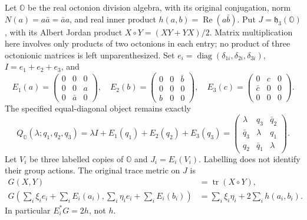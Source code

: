 Let $\mathbb O$ be the real octonion division algebra, with its original
conjugation, norm $N(a)=a\bar a=\bar a a$, and real inner product
$h(a,b)=\operatorname{Re}(a\bar b)$. Put $J=\mathfrak h_3(\mathbb O)$,
with its Albert Jordan product $X\circ Y=(XY+YX)/2$. Matrix multiplication
here involves only products of two octonions in each entry; no product
of three octonionic matrices is left unparenthesized. Set
$e_i=\operatorname{diag}(\delta_{1i},\delta_{2i},\delta_{3i})$,
$I=e_1+e_2+e_3$, and
\[
 E_1(a)=\begin{pmatrix}0&0&0\\0&0&a\\0&\bar a&0\end{pmatrix},\quad
 E_2(b)=\begin{pmatrix}0&0&\bar b\\0&0&0\\b&0&0\end{pmatrix},\quad
 E_3(c)=\begin{pmatrix}0&c&0\\\bar c&0&0\\0&0&0\end{pmatrix}.
\]
The specified equal-diagonal object remains exactly
\begin{equation}
 Q_{\mathbb O}(\lambda;q_1,q_2,q_3)
 =\lambda I+E_1(q_1)+E_2(q_2)+E_3(q_3)
 =\begin{pmatrix}\lambda&q_3&\bar q_2\\
 \bar q_3&\lambda&q_1\\q_2&\bar q_1&\lambda\end{pmatrix}.
 \label{h24:att:eq:Q}
\end{equation}
Let $V_i$ be three labelled copies of $\mathbb O$ and $J_i=E_i(V_i)$.
Labelling does not identify their group actions. The original trace
metric on $J$ is
\begin{equation}
\begin{split}
 G(X,Y)&=\operatorname{tr}(X\circ Y),\\
 G\left(\sum_i\xi_i e_i+\sum_iE_i(a_i),
        \sum_i\eta_i e_i+\sum_iE_i(b_i)\right)
 &=\sum_i\xi_i\eta_i+2\sum_i h(a_i,b_i).
\end{split}
\label{h24:att:eq:metrics}
\end{equation}
In particular $E_i^*G=2h$, not $h$.


